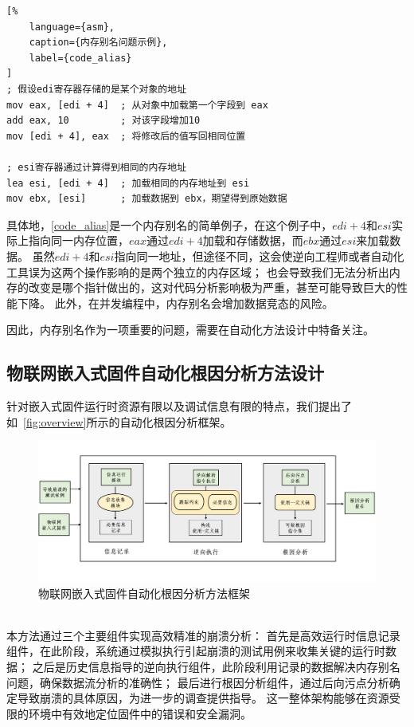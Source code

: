 \begin{lstlisting}[%
    language={asm},
    caption={内存别名问题示例},
    label={code_alias}
]
; 假设edi寄存器存储的是某个对象的地址
mov eax, [edi + 4]  ; 从对象中加载第一个字段到 eax
add eax, 10         ; 对该字段增加10
mov [edi + 4], eax  ; 将修改后的值写回相同位置

; esi寄存器通过计算得到相同的内存地址
lea esi, [edi + 4]  ; 加载相同的内存地址到 esi
mov ebx, [esi]      ; 加载数据到 ebx，期望得到原始数据
\end{lstlisting}

具体地，\autoref{code_alias}是一个内存别名的简单例子，在这个例子中，$edi+4$和$esi$实际上指向同一内存位置，$eax$通过$edi + 4$加载和存储数据，而$ebx$通过$esi$来加载数据。
虽然$edi+4$和$esi$指向同一地址，但途径不同，这会使逆向工程师或者自动化工具误为这两个操作影响的是两个独立的内存区域；
也会导致我们无法分析出内存的改变是哪个指针做出的，这对代码分析影响极为严重，甚至可能导致巨大的性能下降。
此外，在并发编程中，内存别名会增加数据竞态的风险。

因此，内存别名作为一项重要的问题，需要在自动化方法设计中特备关注。

\subsection{物联网嵌入式固件自动化根因分析方法设计} %
针对嵌入式固件运行时资源有限以及调试信息有限的特点，我们提出了如~\autoref{fig:overview}所示的自动化根因分析框架。
\begin{figure}[h]
    \centering
    \includegraphics[width=1.0\textwidth]{./figure/Overview.png}
    \caption{物联网嵌入式固件自动化根因分析方法框架}
    \label{fig:overview}
\end{figure}\\
本方法通过三个主要组件实现高效精准的崩溃分析：
首先是高效运行时信息记录组件，在此阶段，系统通过模拟执行引起崩溃的测试用例来收集关键的运行时数据；
之后是历史信息指导的逆向执行组件，此阶段利用记录的数据解决内存别名问题，确保数据流分析的准确性；
最后进行根因分析组件，通过后向污点分析确定导致崩溃的具体原因，为进一步的调查提供指导。
这一整体架构能够在资源受限的环境中有效地定位固件中的错误和安全漏洞。

